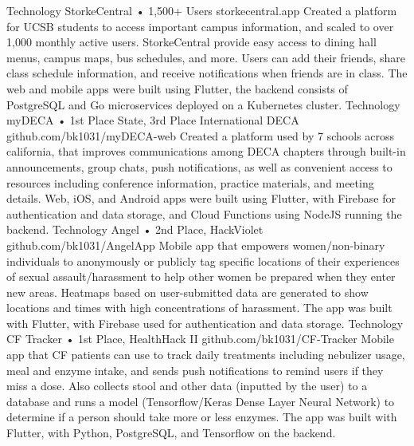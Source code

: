 \documentclass[9pt]{developercv} %
\begin{document}
\vspace{-18 pt}
\begin{entrylist}
    \entry
		{Technology}
		{StorkeCentral • 1,500+ Users}
		{storkecentral.app}
		{
            Created a platform for UCSB students to access important campus information, and scaled to over 1,000 monthly active users.
            StorkeCentral provide easy access to dining hall menus, campus maps, bus schedules, and more.
            Users can add their friends, share class schedule information, and receive notifications when friends are in class.
            The web and mobile apps were built using Flutter, the backend consists of PostgreSQL and Go microservices deployed on a Kubernetes cluster.
        }
    \entry
		{Technology}
		{myDECA • 1st Place State, 3rd Place International DECA}
		{github.com/bk1031/myDECA-web}
		{
            Created a platform used by 7 schools across california, that improves communications among DECA chapters through built-in announcements, group chats, push notifications, as well as convenient access to resources including conference information, practice materials, and meeting details.
            Web, iOS, and Android apps were built using Flutter, with Firebase for authentication and data storage, and Cloud Functions using NodeJS running the backend.
        }
	\entry
		{Technology}
		{Angel • 2nd Place, HackViolet}
		{github.com/bk1031/AngelApp}
		{
            Mobile app that empowers women/non-binary individuals to anonymously or publicly tag specific locations of their experiences of sexual assault/harassment to help other women be prepared when they enter new areas.
            Heatmaps based on user-submitted data are generated to show locations and times with high concentrations of harassment.
            The app was built with Flutter, with Firebase used for authentication and data storage.
        }
    \entry
		{Technology}
		{CF Tracker • 1st Place, HealthHack II}
		{github.com/bk1031/CF-Tracker}
		{
            Mobile app that CF patients can use to track daily treatments including nebulizer usage, meal and enzyme intake, and sends push notifications to remind users if they miss a dose.
            Also collects stool and other data (inputted by the user) to a database and runs a model (Tensorflow/Keras Dense Layer Neural Network) to determine if a person should take more or less enzymes.
            The app was built with Flutter, with Python, PostgreSQL, and Tensorflow on the backend.
        }
\end{entrylist}
\end{document}
